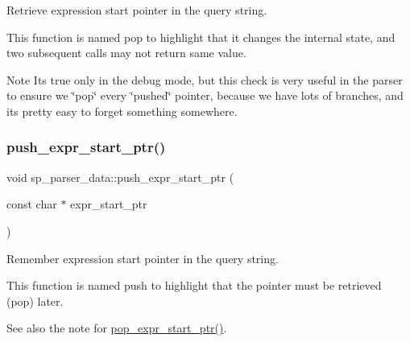 Retrieve expression start pointer in the query string.

This function is named \textquotesingle{}pop\textquotesingle{} to highlight that it changes the internal state, and two subsequent calls may not return same value.

\begin{DoxyNote}{Note}
It\textquotesingle{}s true only in the debug mode, but this check is very useful in the parser to ensure we \char`\"{}pop\char`\"{} every \char`\"{}pushed\char`\"{} pointer, because we have lots of branches, and it\textquotesingle{}s pretty easy to forget something somewhere. 
\end{DoxyNote}
\mbox{\label{classsp__parser__data_a77dfbb5239b57530590b027d237f7ef9}} 
\subsubsection{\texorpdfstring{push\+\_\+expr\+\_\+start\+\_\+ptr()}{push\_expr\_start\_ptr()}}
{\footnotesize\ttfamily void sp\+\_\+parser\+\_\+data\+::push\+\_\+expr\+\_\+start\+\_\+ptr (\begin{DoxyParamCaption}\item[{const char $\ast$}]{expr\+\_\+start\+\_\+ptr }\end{DoxyParamCaption})\hspace{0.3cm}{\ttfamily [inline]}}

Remember expression start pointer in the query string.

This function is named \textquotesingle{}push\textquotesingle{} to highlight that the pointer must be retrieved (pop) later.

\begin{DoxySeeAlso}{See also}
the note for \mbox{\hyperlink{classsp__parser__data_a4665278dcaa28b14d1f3d4ae88694f66}{pop\+\_\+expr\+\_\+start\+\_\+ptr()}}. 
\end{DoxySeeAlso}
\mbox{\label{classsp__parser__data_a2d911e54b0127570092c3aaabd7a989e}} 
